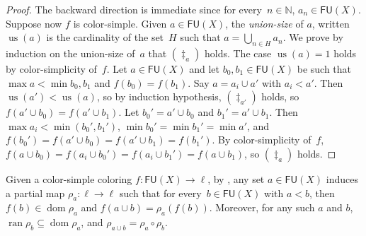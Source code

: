 \documentclass{article}
\newcommand{\NN}[0]{\mathbb{N}}
\newcommand{\dom}{\operatorname{dom}}
\newcommand{\ran}{\operatorname{ran}}
\newcommand{\us}{\operatorname{us}}
\newcommand{\FU}[0]{\mathsf{FU}} %
\numberwithin{theorem}{section}
\newtheorem{lemma}[theorem]{Lemma}
\begin{document}
\begin{proof}
The backward direction is immediate since for every~$n \in \NN$, $a_n \in \FU(X)$.
Suppose now $f$ is color-simple. Given $a \in \FU(X)$, the \emph{union-size} of $a$, written $\us(a)$ is the cardinality of the set~$H$ such that $a = \bigcup_{n \in H} a_n$. We prove by induction on the union-size of~$a$ that $(\ddagger_{a})$ holds. The case $\us(a) = 1$ holds by color-simplicity of~$f$. Let $a \in \FU(X)$ and let $b_0, b_1 \in \FU(X)$ be such that $\max a < \min b_0, b_1$ and $f(b_0) = f(b_1)$. Say $a = a_i \cup a'$ with $a_i < a'$.
Then $\us(a') < \us(a)$, so by induction hypothesis, $(\ddagger_{a'})$ holds, so $f(a' \cup b_0) = f(a' \cup b_1)$.
Let $b_0' = a' \cup b_0$ and $b_1' = a' \cup b_1$. Then $\max a_i < \min(b_0', b_1')$, $\min b_0' = \min b_1' = \min a'$, and $f(b_0') = f(a' \cup b_0) = f(a' \cup b_1) = f(b_1')$. By color-simplicity of~$f$, $f(a \cup b_0) = f(a_i \cup b_0') = f(a_i \cup b_1') = f(a \cup b_1)$, so $(\ddagger_a)$ holds. 
\end{proof}

Given a color-simple coloring $f : \FU(X) \to \ell$, by , any set $a \in \FU(X)$ induces a partial map $\rho_a : \ell \to \ell$ such that for every~$b \in \FU(X)$ with $a < b$, then $f(b) \in \dom \rho_a$ and $f(a \cup b) = \rho_a(f(b))$. Moreover, for any such $a$ and $b$, $\ran \rho_b \subseteq \dom \rho_a$, and $\rho_{a \cup b} = \rho_a \circ \rho_b$.
\end{document}
